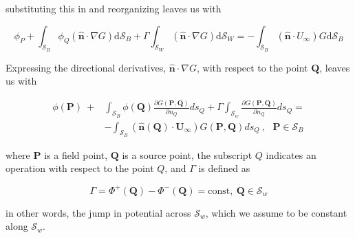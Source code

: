 	\noindent substituting this in and reorganizing leaves us with
	
	\begin{equation}
	\phi_P + \int_{\mathcal{S}_B} \phi_Q \left( \mathbf{\hat{n}} \cdot \nabla G \right) \mathrm{d} \mathcal{S}_B + \Gamma \int_{\mathcal{S}_W} \left( \mathbf{\hat{n}} \cdot \nabla G \right) \mathrm{d} \mathcal{S}_W = -\int_{\mathcal{S}_B} \left( \mathbf{\hat{n}} \cdot U_{\infty} \right) G \mathrm{d} \mathcal{S}_B
	\end{equation}
	
	Expressing the directional derivatives, \(\mathbf{\hat{n}} \cdot \nabla G \), with respect to the point $\mathbf{Q}$, leaves us with 
	
	\begin{equation}
	\begin{aligned}
	\label{eqn:continuousformulation}
	\phi(\mathbf{P})~+ &\int_{\mathcal{S}_B} \phi(\mathbf{Q})\frac{\partial G(\mathbf{P},\mathbf{Q})}{\partial n_Q} ds_Q + \Gamma \int_{\mathcal{S}_w} \frac{\partial G (\mathbf{P},\mathbf{Q})}{\partial n_Q} ds_Q =\\
	&- \int_{\mathcal{S}_B} \left(\mathbf{\hat{n}}(\mathbf{Q}) \cdot  \mathbf{U}_{\infty} \right) G(\mathbf{P},\mathbf{Q}) ds_Q~, ~~~\mathbf{P} \in \mathcal{S}_B
	\end{aligned}
	\end{equation}
	
	\noindent where $\mathbf{P}$ is a field point, $\mathbf{Q}$ is a source point, the subscript \(Q\) indicates an operation with respect to the point \(Q\), and $\Gamma$ is defined as
	
	\begin{equation} 
	\Gamma = \Phi^+(\mathbf{Q}) - \Phi^-(\mathbf{Q}) = \mathrm{const}, ~\mathbf{Q} \in \mathcal{S}_w 
	\end{equation} 
	
	\noindent in other words, the jump in potential across $\mathcal{S}_w$, which we assume to be constant along $\mathcal{S}_w$.
	
	
